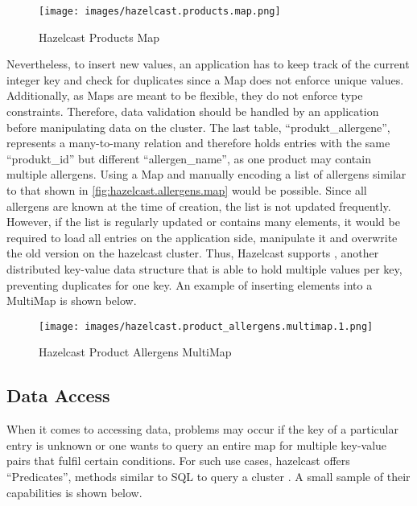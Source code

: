 \begin{figure}[H]
    \centering
    \caption{Hazelcast Products Map} \label{fig:hazelcast.products.map}
    \texttt{[image: images/hazelcast.products.map.png]}
\end{figure}

Nevertheless, to insert new values, an application has to keep track of the current integer key and check
for duplicates since a Map does not enforce unique values. Additionally, as Maps are meant to be flexible,
they do not enforce type constraints. Therefore, data validation should be handled by an application before
manipulating data on the cluster.
The last table, \enquote{produkt\_allergene},
represents a many-to-many relation and therefore holds entries with the
same \enquote{produkt\_id} but different \enquote{allergen\_name}, as one product may contain multiple allergens.
Using a Map and manually encoding a list of allergens similar to that shown in \autoref{fig:hazelcast.allergens.map}
would be possible. Since all allergens are known at the time of creation, the
list is not updated frequently. However, if the list is regularly updated or contains many elements, it
would be required to load all entries on the application side, manipulate it and overwrite the old version
on the hazelcast cluster.
Thus, Hazelcast supports \textcite{Hazelcast.DataStructure.MultiMap}, another distributed key-value data structure that is able to hold
multiple values per key, preventing duplicates for one key.
An example of inserting elements into a MultiMap is shown below.

\begin{figure}[H]
    \centering
    \caption{Hazelcast Product Allergens MultiMap} \label{fig:hazelcast.product_allergens.1.multimap}
    \texttt{[image: images/hazelcast.product\_allergens.multimap.1.png]}
\end{figure}

\subsection{Data Access} \label{subsec:dataAccessHazelcast}

When it comes to accessing data, problems may occur if the key of a particular entry is unknown or one wants
to query an entire map for multiple key-value pairs that fulfil certain conditions. For such use cases,
hazelcast offers \enquote{Predicates}, methods similar to SQL to query a cluster \parencite{Hazelcast.Predicates}.
A small sample of their capabilities is shown below.

